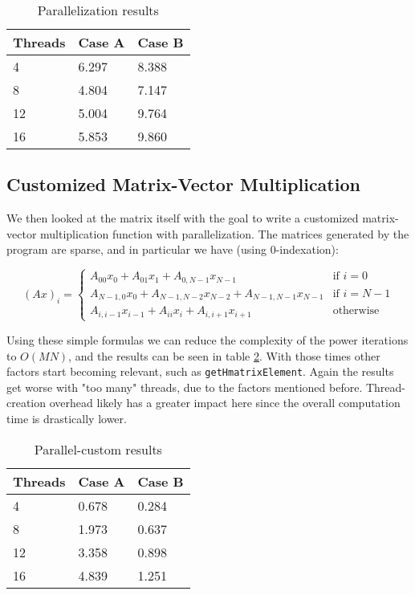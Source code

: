 \documentclass[a4paper, 11pt]{article}
\begin{document}
\begin{table}[!h]
\centering
\begin{tabular}{|l|l|l|}
\hline
\textbf{Threads} & \textbf{Case A} & \textbf{Case B} \\ \hline
4       & 6.297  & 8.388  \\ \hline
8       & 4.804  & 7.147  \\ \hline
12      & 5.004  & 9.764  \\ \hline
16      & 5.853  & 9.860  \\ \hline
\end{tabular}
\caption{Parallelization results}
\label{table:parall}
\end{table}

\subsection{Customized Matrix-Vector Multiplication}

We then looked at the matrix itself with the goal to write a customized matrix-vector multiplication function with parallelization. The matrices generated by the program are sparse, and in particular we have (using $0$-indexation):

$$(Ax)_i = \begin{cases}
A_{00}x_0 + A_{01}x_1+A_{0,N-1}x_{N-1} & \mbox{if } i=0 \\
A_{N-1,0} x_0 + A_{N-1,N-2} x_{N-2} + A_{N-1,N-1} x_{N-1} & \mbox{if } i=N-1 \\
A_{i,i-1} x_{i-1} + A_{ii} x_i + A_{i,i+1} x_{i+1} & \mbox{otherwise}
\end{cases}$$

Using these simple formulas we can reduce the complexity of the power iterations to $O(MN)$, and the results can be seen in table \ref{table:parall-custom}. With those times other factors start becoming relevant, such as \texttt{getHmatrixElement}. Again the results get worse with "too many" threads, due to the factors mentioned before. Thread-creation overhead likely has a greater impact here since the overall computation time is drastically lower.

\begin{table}[!h]
\centering
\begin{tabular}{|l|l|l|}
\hline
\textbf{Threads }& \textbf{Case A} & \textbf{Case B} \\ \hline
4       & 0.678  & 0.284  \\ \hline
8       & 1.973  & 0.637  \\ \hline
12      & 3.358  & 0.898  \\ \hline
16      & 4.839  & 1.251  \\ \hline
\end{tabular}
\caption{Parallel-custom results}
\label{table:parall-custom}
\end{table}
\end{document}
